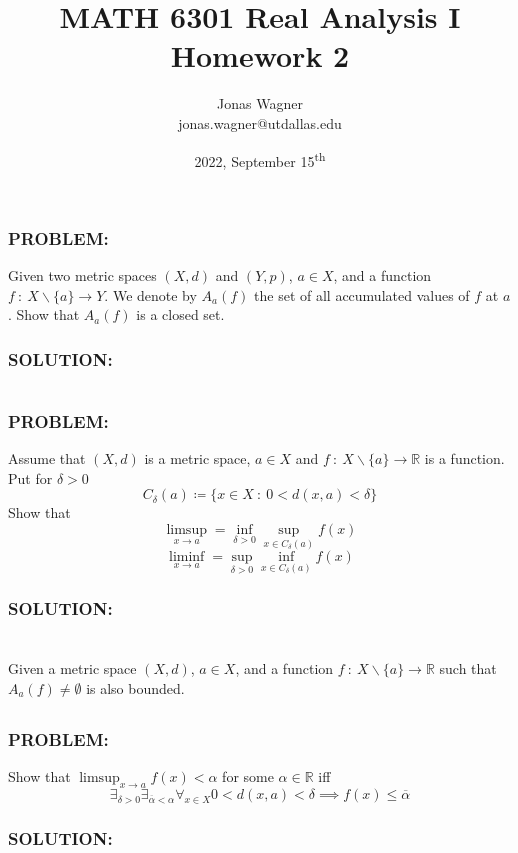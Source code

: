 \documentclass[]{article}
\title{MATH 6301 Real Analysis I \\ Homework 2}
\author{Jonas Wagner\\ jonas.wagner@utdallas.edu}
\date{2022, September 15\textsuperscript{th}}
\newcommand{\Problem}{\subsubsection*{\textbf{PROBLEM:}}}
\newcommand{\Solution}{\subsubsection*{\textbf{SOLUTION:}}}
\newcommand{\R}{\mathbb{R}}
\newcommand{\st}{\ : \ }
\begin{document}
\maketitle

\tableofcontents



\newpage
\section{}
\Problem
Given two metric spaces $(X,d)$ and $(Y,p)$, $a \in X$, and a function $f \st X \backslash \{a\} \to Y$.
We denote by $A_a(f)$ the set of all accumulated values of $f$ at $a$.
Show that $A_a(f)$ is a closed set.

\Solution






\newpage
\section{}
\Problem
Assume that $(X,d)$ is a metric space, $a \in X$ and $f \st X \backslash \{a\} \to \R$ is a function.
Put for $\delta > 0$ \[
    C_\delta(a) \coloneqq \{x \in X \st 0 < d(x,a) < \delta\}
\] Show that \[
    \limsup_{x \to a} = \inf_{\delta > 0} \sup_{x \in C_\delta(a)} f(x)
\]\[
    \liminf_{x \to a} = \sup_{\delta > 0} \inf_{x \in C_\delta(a)} f(x)
\]

\Solution









\newpage
\section{}
Given a metric space $(X,d)$, $a \in X$, and a function $f \st X \backslash \{a\} \to \R$ such that $A_a(f) \neq \emptyset$ is also bounded. 

\subsection{}
\Problem
Show that $\limsup_{x \to a} f(x) < \alpha$ for some $\alpha \in \R$ iff \[
    \exists_{\delta>0} \exists_{\overline{\alpha}< \alpha} \forall_{x \in X} 0 < d(x,a) < \delta \implies f(x) \leq \overline{\alpha}
\]
\Solution
\end{document}
